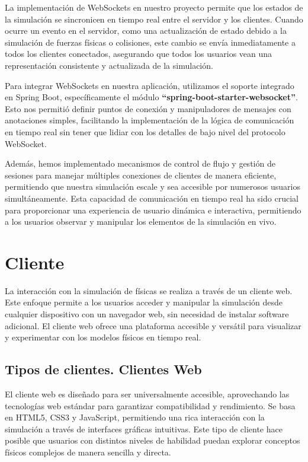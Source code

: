 La implementación de WebSockets en nuestro proyecto permite que los estados de la simulación se sincronicen en tiempo real entre el servidor y los clientes. Cuando ocurre un evento en el servidor, como una actualización de estado debido a la simulación de fuerzas físicas o colisiones, este cambio se envía inmediatamente a todos los clientes conectados, asegurando que todos los usuarios vean una representación consistente y actualizada de la simulación.

Para integrar WebSockets en nuestra aplicación, utilizamos el soporte integrado en Spring Boot, específicamente el módulo \textbf{``spring-boot-starter-websocket''}. Esto nos permitió definir puntos de conexión y manipuladores de mensajes con anotaciones simples, facilitando la implementación de la lógica de comunicación en tiempo real sin tener que lidiar con los detalles de bajo nivel del protocolo WebSocket.

Además, hemos implementado mecanismos de control de flujo y gestión de sesiones para manejar múltiples conexiones de clientes de manera eficiente, permitiendo que nuestra simulación escale y sea accesible por numerosos usuarios simultáneamente. Esta capacidad de comunicación en tiempo real ha sido crucial para proporcionar una experiencia de usuario dinámica e interactiva, permitiendo a los usuarios observar y manipular los elementos de la simulación en vivo.


\section{Cliente}

La interacción con la simulación de físicas se realiza a través de un cliente web. Este enfoque permite a los usuarios acceder y manipular la simulación desde cualquier dispositivo con un navegador web, sin necesidad de instalar software adicional. El cliente web ofrece una plataforma accesible y versátil para visualizar y experimentar con los modelos físicos en tiempo real.

\subsection{Tipos de clientes. Clientes Web}
El cliente web es diseñado para ser universalmente accesible, aprovechando las tecnologías web estándar para garantizar compatibilidad y rendimiento. Se basa en HTML5, CSS3 y JavaScript, permitiendo una rica interacción con la simulación a través de interfaces gráficas intuitivas. Este tipo de cliente hace posible que usuarios con distintos niveles de habilidad puedan explorar conceptos físicos complejos de manera sencilla y directa.

